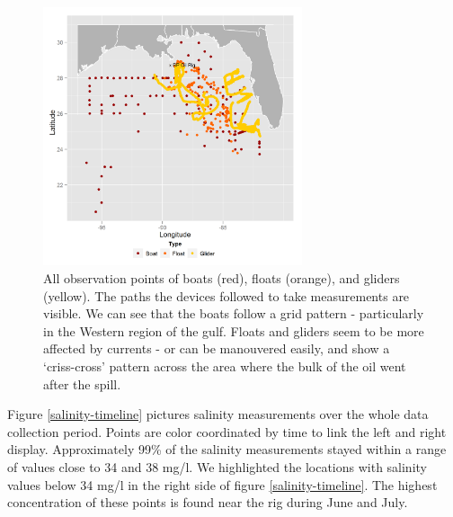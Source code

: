 \documentclass[authoryear,12pt]{elsarticle}
\newcommand{\red}[1]{{\color{red} #1}}
\begin{document}
\begin{figure}[htbp] %
   \centering
   \includegraphics[width=3in]{boats-floats-gliders.png} 
   \caption{All observation points of boats (red), floats (orange), and gliders (yellow). The paths the devices followed to take measurements are visible. We can see that the boats follow a grid pattern - particularly in the Western region of the gulf. Floats and gliders seem to be more affected by currents - or can be manouvered easily, and show a `criss-cross' pattern across the area where the bulk of the oil went after the spill.}
   \label{Boats, Floats and Gliders}
\end{figure}
Figure \ref{salinity-timeline} pictures salinity measurements over the whole data collection period. Points are color coordinated by time to link the left and right display. Approximately 99\% of the salinity measurements stayed within a range of values close {to} 34 and 38 mg/l.
{We highlighted the locations with salinity values below 34 mg/l} in the right side of figure \ref{salinity-timeline}. The highest concentration of these points is found near the rig during June and July.
\end{document}
